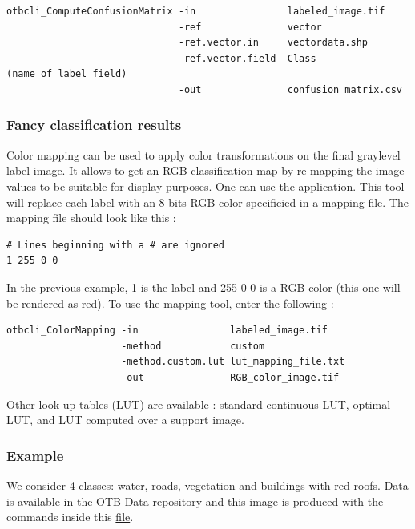 \begin{verbatim}
otbcli_ComputeConfusionMatrix -in                labeled_image.tif
                              -ref               vector
                              -ref.vector.in     vectordata.shp
                              -ref.vector.field  Class (name_of_label_field)
                              -out               confusion_matrix.csv
\end{verbatim}



\subsubsection{Fancy classification results}
\label{ssec:classificationcolormapping}
Color mapping can be used to apply color transformations on the final
graylevel label image. It allows to get an RGB classification map
by re-mapping the image values to be suitable for display purposes.
One can use the  application. This tool will
replace each label with an 8-bits RGB color specificied in a mapping
file. The mapping file should look like this :

\begin{verbatim}
# Lines beginning with a # are ignored
1 255 0 0
\end{verbatim}

In the previous example, 1 is the label and 255 0 0 is a RGB color
(this one will be rendered as red). To use the mapping tool, enter
the following :

\begin{verbatim}
otbcli_ColorMapping -in                labeled_image.tif
                    -method            custom
                    -method.custom.lut lut_mapping_file.txt
                    -out               RGB_color_image.tif
\end{verbatim}

Other look-up tables (LUT) are available : standard continuous LUT,
optimal LUT, and LUT computed over a support image.

\subsubsection{Example}

We consider 4 classes: water, roads, vegetation and buildings with red roofs.
Data is available in the OTB-Data
\href{http://hg.orfeo-toolbox.org/OTB-Data/file/0fed8f4f035c/Input/Classification}{repository}
and this image is produced with the commands inside this
\href{http://hg.orfeo-toolbox.org/OTB-Applications/file/3ce975605013/Testing/Classification/CMakeLists.txt}{file}.

